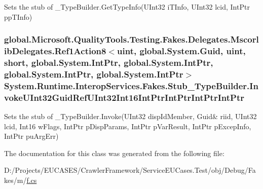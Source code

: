 Sets the stub of \-\_\-\-Type\-Builder.\-Get\-Type\-Info(\-U\-Int32 i\-T\-Info, U\-Int32 lcid, Int\-Ptr pp\-T\-Info)

\hypertarget{class_system_1_1_runtime_1_1_interop_services_1_1_fakes_1_1_stub___type_builder_a197209eea0a97205afff1a24d510d867}{
\subsubsection[{Invoke\-U\-Int32\-Guid\-Ref\-U\-Int32\-Int16\-Int\-Ptr\-Int\-Ptr\-Int\-Ptr\-Int\-Ptr}]{\setlength{\rightskip}{0pt plus 5cm}global.\-Microsoft.\-Quality\-Tools.\-Testing.\-Fakes.\-Delegates.\-Mscorlib\-Delegates.\-Ref1\-Action8$<$uint, global.\-System.\-Guid, uint, short, global.\-System.\-Int\-Ptr, global.\-System.\-Int\-Ptr, global.\-System.\-Int\-Ptr, global.\-System.\-Int\-Ptr$>$ System.\-Runtime.\-Interop\-Services.\-Fakes.\-Stub\-\_\-\-Type\-Builder.\-Invoke\-U\-Int32\-Guid\-Ref\-U\-Int32\-Int16\-Int\-Ptr\-Int\-Ptr\-Int\-Ptr\-Int\-Ptr}}\label{class_system_1_1_runtime_1_1_interop_services_1_1_fakes_1_1_stub___type_builder_a197209eea0a97205afff1a24d510d867}


Sets the stub of \-\_\-\-Type\-Builder.\-Invoke(U\-Int32 disp\-Id\-Member, Guid\& riid, U\-Int32 lcid, Int16 w\-Flags, Int\-Ptr p\-Disp\-Params, Int\-Ptr p\-Var\-Result, Int\-Ptr p\-Excep\-Info, Int\-Ptr pu\-Arg\-Err)



The documentation for this class was generated from the following file\-:\begin{DoxyCompactItemize}
\item 
D\-:/\-Projects/\-E\-U\-C\-A\-S\-E\-S/\-Crawler\-Framework/\-Service\-E\-U\-Cases.\-Test/obj/\-Debug/\-Fakes/m/\hyperlink{m_2f_8cs}{f.\-cs}\end{DoxyCompactItemize}
